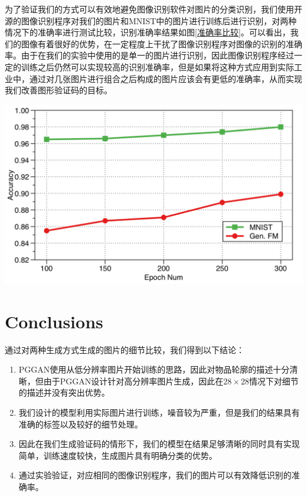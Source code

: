 \documentclass[12pt]{article}
\begin{document}
  为了验证我们的方式可以有效地避免图像识别软件对图片的分类识别，我们使用开源的图像识别程序对我们的图片和MNIST中的图片进行训练后进行识别，对两种情况下的准确率进行测试比较，识别准确率结果如图\ref{准确率比较}。可以看出，我们的图像有着很好的优势，在一定程度上干扰了图像识别程序对图像的识别的准确率。由于在我们的实验中使用的是单一的图片进行识别，因此图像识别程序经过一定的训练之后仍然可以实现较高的识别准确率，但是如果将这种方式应用到实际工业中，通过对几张图片进行组合之后构成的图片应该会有更低的准确率，从而实现我们改善图形验证码的目标。

\begin{center}\vspace{1cm}
\includegraphics[width=0.8\linewidth]{Experiments.png}
\label{准确率比较}
\end{center}\vspace{1cm}


\section*{Conclusions}

  通过对两种生成方式生成的图片的细节比较，我们得到以下结论：
\begin{enumerate}
	\item PGGAN\supercite{DBLP:journals/corr/abs-1710-10196}使用从低分辨率图片开始训练的思路，因此对物品轮廓的描述十分清晰，但由于PGGAN设计针对高分辨率图片生成，因此在$28 \times 28$情况下对细节的描述并没有突出优势。
	\item 我们设计的模型利用实际图片进行训练，噪音较为严重，但是我们的结果具有准确的标签以及较好的细节处理。
	\item 因此在我们生成验证码的情形下，我们的模型在结果足够清晰的同时具有实现简单，训练速度较快，生成图片具有明确分类的优势。
	\item 通过实验验证，对应相同的图像识别程序，我们的图片可以有效降低识别的准确率。
\end{enumerate}
\end{document}
